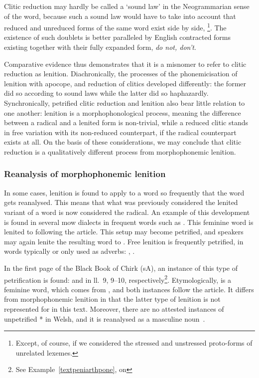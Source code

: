 Clitic reduction may hardly be called a `sound law' in the Neogrammarian sense of the word, because such a sound law would have to take into account that reduced and unreduced forms of the same word  exist side by side, \eg {}\footnote{%
Except, of course, if we considered the stressed and unstressed proto-forms of  unrelated lexemes.
}.
The existence of such doublets is better paralleled by English contracted forms existing together with their fully expanded form, \eg \emph{do not, don't}.

Comparative evidence thus demonstrates that it is a misnomer to refer to clitic reduction as lenition.
Diachronically, the processes of the phonemicisation of lenition with apocope, and reduction of clitics developed differently: the former did so according to sound laws while the latter did so haphazardly.
Synchronically, petrified clitic reduction and lenition also bear little relation to one another: lenition is a morphophonological process, meaning the difference between a radical and a lenited form is non-trivial, while a reduced clitic stands in free variation with its non-reduced counterpart, if the radical counterpart exists at all. 
On the basis of these considerations, we may conclude that clitic reduction is a qualitatively different process from morphophonemic lenition. 

\subsubsection{Reanalysis of morphophonemic lenition}
\label{sec:rean-morph-lenit}
In some cases, lenition is found to apply to a word so frequently that the word gets reanalysed. 
This means that what was previously considered the lenited variant of a word is now considered the radical. 
An example of this development is found in several \gls{mow} dialects in frequent words such as . 
This feminine word is lenited to  following the article. 
This setup may become petrified, and speakers may again lenite the resulting word to .
Free lenition is frequently petrified, \eg in words typically or only used as adverbs: , .


In the first page of the Black Book of Chirk (\gls{sA}), an instance of this type of petrification is found:  and  in ll.~9, 9--10, respectively\footnote{See Example~\ref{textpeniarthpone}, on }. 
Etymologically,  is a feminine word, which comes from , and both instances follow the article. 
It differs from morphophonemic lenition in that the latter type of lenition is not represented for  in this text. 
Moreover, there are no attested instances of unpetrified * in Welsh, and it is reanalysed as a masculine noun~\autocite[Grawys, Garawys]{bevan_geiriadur_2014}. 


